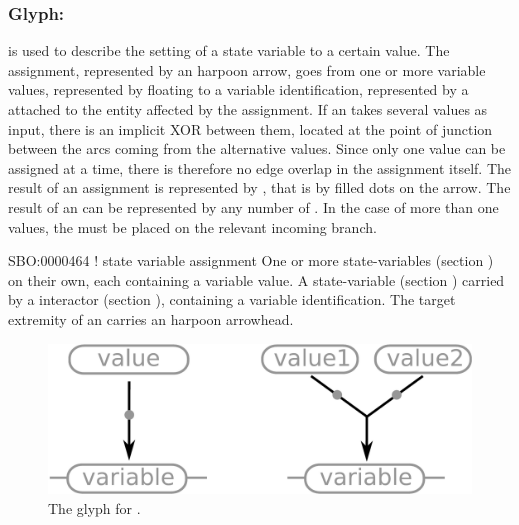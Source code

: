 
\subsubsection{Glyph: }\label{sec:assignment}

 is used to describe the setting of a state variable to a certain value. The assignment, represented by an harpoon arrow, goes from one or more variable values, represented by floating  to a variable identification, represented by a  attached to the entity affected by the assignment. If an  takes several  values as input, there is an implicit XOR between them, located at the point of junction between the arcs coming from the alternative values. Since only one value can be assigned at a time, there is therefore no edge overlap in the assignment itself. The result of an assignment is represented by , that is by filled dots on the arrow. The result of an  can be represented by any number of . In the case of more than one  values, the  must be placed on the relevant incoming branch.

\begin{glyphDescription}
 \glyphSboTerm SBO:0000464 ! state variable assignment
 \glyphOrigin One or more state-variables (section ) on their own, each containing a variable value.
 \glyphTarget A state-variable (section ) carried by a interactor (section ), containing a variable identification.
 \glyphEndPoint The target extremity of an  carries an harpoon arrowhead.
 \end{glyphDescription}

\begin{figure}[H]
  \centering
  \includegraphics[scale = 0.3]{images/assignment}
  \caption{The \ER glyph for .}
  \label{fig:assignment}
\end{figure}

